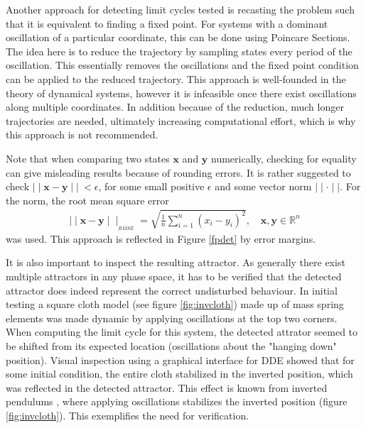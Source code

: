 Another approach for detecting limit cycles tested is recasting the problem such that it is equivalent to finding a fixed point. For systems with a dominant oscillation of a particular coordinate, this can be done using Poincare Sections. The idea here is to reduce the trajectory by sampling states every period of the oscillation. This essentially removes the oscillations and the fixed point condition can be applied to the reduced trajectory. This approach is well-founded in the theory of dynamical systems, however it is infeasible once there exist oscillations along multiple coordinates. In addition because of the reduction, much longer trajectories are needed, ultimately increasing computational effort, which is why this approach is not recommended. 

Note that when comparing two states $\mathbf{x}$ and $\mathbf{y}$ numerically, checking for equality can give misleading results because of rounding errors. It is rather suggested to check $\mid\mid \mathbf{x} - \mathbf{y} \mid\mid\ < \epsilon$, for some small positive $\epsilon$ and some vector norm $\mid\mid\cdot\mid\mid$. For the norm, the root mean square error \begin{gather}\mid\mid \mathbf{x} - \mathbf{y} \mid\mid_{_{RMSE}} = \sqrt{\frac{1}{n}\sum_{i=1}^{n}(x_i-y_i)^2},\quad \mathbf{x},\mathbf{y} \in \mathbb{R}^n\end{gather}was used. This approach is reflected in Figure \ref{fpdet} by error margins. 

It is also important to inspect the resulting attractor. As generally there exist multiple attractors in any phase space, it has to be verified that the detected attractor does indeed represent the correct undisturbed behaviour. In initial testing a square cloth model (see figure \ref{fig:invcloth}) made up of mass spring elements was made dynamic by applying oscillations at the top two corners. When computing the limit cycle for this system, the detected attrator seemed to be shifted from its expected location (oscillations about the "hanging down" position). Visual inspection using a graphical interface for DDE showed that for some initial condition, the entire cloth stabilized in the inverted position, which was reflected in the detected attractor. This effect is known from inverted pendulums \cite{invpend}, where applying oscillations stabilizes the inverted position (figure \ref{fig:invcloth}). This exemplifies the need for verification.  

